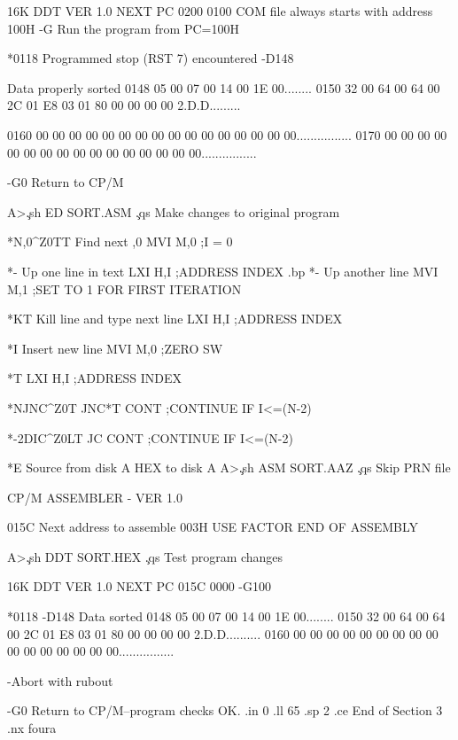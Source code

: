 16K DDT VER 1.0
NEXT PC
0200 0100    COM file always starts with address 100H
-G     Run the program from PC=100H

*0118    Programmed stop (RST 7) encountered
-D148

                              Data properly sorted
0148 05 00 07 00 14 00 1E 00........
0150 32 00 64 00 64 00 2C 01 E8 03 01 80 00 00 00 00 2.D.D.........

0160 00 00 00 00 00 00 00 00 00 00 00 00 00 00 00 00................
0170 00 00 00 00 00 00 00 00 00 00 00 00 00 00 00 00................

-G0   Return to CP/M

A>\c
.sh
ED SORT.ASM     \c
.qs
Make changes to original program

*N,0^Z0TT     Find next ,0
     MVI        M,0        ;I = 0

*-   Up one line in text
     LXI            H,I    ;ADDRESS INDEX
.bp
*-   Up another line
     MVI            M,1    ;SET TO 1 FOR FIRST ITERATION

*KT  Kill line and type next line
     LXI            H,I    ;ADDRESS INDEX

*I   Insert new line
     MVI            M,0    ;ZERO SW

*T   
     LXI            H,I    ;ADDRESS INDEX

*NJNC^Z0T
    JNC*T
    CONT            ;CONTINUE IF I<=(N-2)

*-2DIC^Z0LT
    JC              CONT   ;CONTINUE IF I<=(N-2)

*E                    Source from disk A
                      HEX to disk A
A>\c
.sh
ASM SORT.AAZ        \c
.qs
Skip PRN file

CP/M ASSEMBLER - VER 1.0

015C    Next address to assemble
003H USE FACTOR
END OF ASSEMBLY

A>\c
.sh
DDT SORT.HEX        \c
.qs
Test program changes

16K DDT VER 1.0
NEXT PC
015C 0000
-G100

*0118
-D148
                          Data sorted
0148 05 00 07 00 14 00 1E 00........
0150 32 00 64 00 64 00 2C 01 E8 03 01 80 00 00 00 00 2.D.D..........
0160 00 00 00 00 00 00 00 00 00 00 00 00 00 00 00 00................

-Abort with rubout

-G0    Return to CP/M--program checks OK.
.in 0
.ll 65
.sp 2
.ce
End of Section 3
.nx foura
